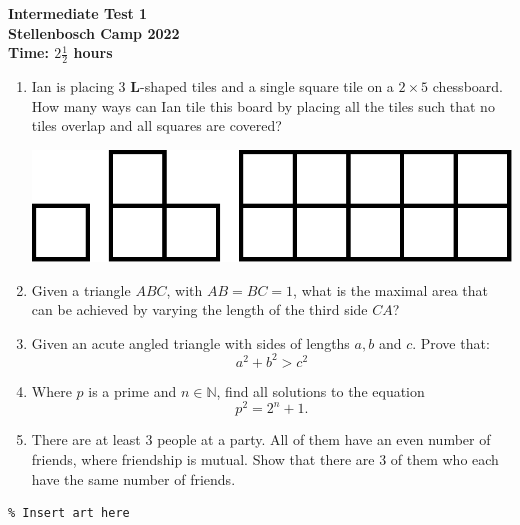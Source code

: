\documentclass{article}
\begin{document}
\thispagestyle{empty}

\begin{center}
  \textbf{\Large Intermediate Test 1}
  \\ \vspace{1em}
  \textbf{\large Stellenbosch Camp 2022}
  \\ \vspace{1em}
  \textbf{\large Time: $2\frac{1}{2}$ hours}
\end{center}

\bigskip

\begin{enumerate}[itemsep=\fill]

\item %
Ian is placing $3$ $\mathbf{L}$-shaped tiles and a single square tile on a $2\times5$ chessboard. How many ways can Ian tile this board by placing all the tiles such that no tiles overlap and all squares are covered?
\begin{center}
    \includegraphics[scale=0.3]{intermediate_Q1_shapes.png}
\end{center}


\item %
Given a triangle $ABC$, with $AB = BC = 1$, what is the maximal area that can be achieved by varying the length of the third side $CA$?

\item %
Given an acute angled triangle with sides of lengths $a,b$ and $c$. Prove that: \[a^2 + b^2 > c^2\]

\item %
Where $p$ is a prime and $n\in\mathbb{N}$, find all solutions to the equation \[p^2 = 2^n + 1.\]

\vspace{0pt}

\item %
There are at least 3 people at a party. All of them have an even number of friends, where friendship is mutual. Show that there are 3 of them who each have the same number of friends.

\end{enumerate}


\vfill
\centering
\small
\begin{BVerbatim}
% Insert art here
\end{BVerbatim}
\end{document}
